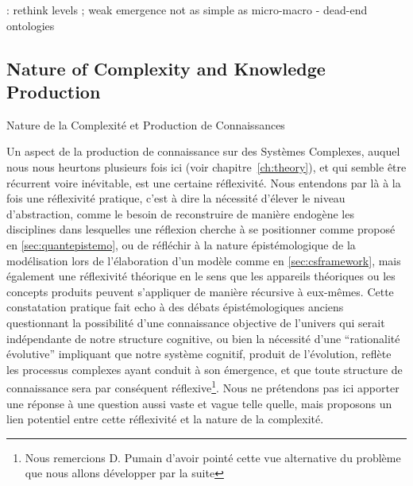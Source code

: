 \cite{roth2009reconstruction} : rethink levels ; weak emergence not as simple as micro-macro - dead-end ontologies






\subsection{Nature of Complexity and Knowledge Production}{Nature de la Complexité et Production de Connaissances}






Un aspect de la production de connaissance sur des Systèmes Complexes, auquel nous nous heurtons plusieurs fois ici (voir chapitre~\ref{ch:theory}), et qui semble être récurrent voire inévitable, est une certaine réflexivité. Nous entendons par là à la fois une réflexivité pratique, c'est à dire la nécessité d'élever le niveau d'abstraction, comme le besoin de reconstruire de manière endogène les disciplines dans lesquelles une réflexion cherche à se positionner comme proposé en \ref{sec:quantepistemo}, ou de réfléchir à la nature épistémologique de la modélisation lors de l'élaboration d'un modèle comme en \ref{sec:csframework}, mais également une réflexivité théorique en le sens que les appareils théoriques ou les concepts produits peuvent s'appliquer de manière récursive à eux-mêmes. Cette constatation pratique fait echo à des débats épistémologiques anciens questionnant la possibilité d'une connaissance objective de l'univers qui serait indépendante de notre structure cognitive, ou bien la nécessité d'une ``rationalité évolutive'' impliquant que notre système cognitif, produit de l'évolution, reflète les processus complexes ayant conduit à son émergence, et que toute structure de connaissance sera par conséquent réflexive\footnote{Nous remercions D. Pumain d'avoir pointé cette vue alternative du problème que nous allons développer par la suite}. Nous ne prétendons pas ici apporter une réponse à une question aussi vaste et vague telle quelle, mais proposons un lien potentiel entre cette réflexivité et la nature de la complexité.


